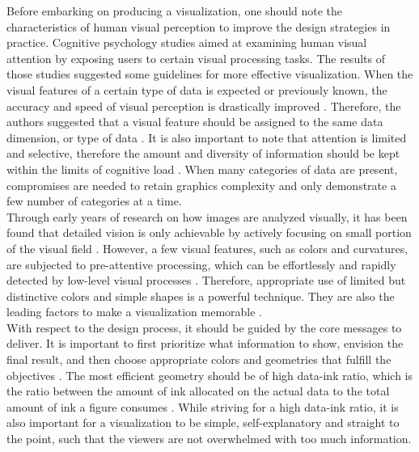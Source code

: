 \documentclass[11pt, a4paper,oneside,chapterprefix=false]{scrbook}
\begin{document}
Before embarking on producing a visualization, one should note the characteristics of human visual perception to improve the design strategies in practice. Cognitive psychology studies aimed at examining human visual attention by exposing users to certain visual processing tasks. The results of those studies suggested some guidelines for more effective visualization. When the visual features of a certain type of data is expected or previously known, the accuracy and speed of visual perception is drastically improved \cite{haroz2012capacity}. Therefore, the authors suggested that a visual feature should be assigned to the same data dimension, or type of data \cite{haroz2012capacity}. It is also important to note that attention is limited and selective, therefore the amount and diversity of information should be kept within the limits of cognitive load \cite{alhadad2018visualizing}. When many categories of data are present, compromises are needed to retain graphics complexity and only demonstrate a few number of categories at a time. \\

Through early years of research on how images are analyzed visually, it has been found that detailed vision is only achievable by actively focusing on small portion of the visual field \cite{itti2001computational, noton1971scanpaths}. However, a few visual features, such as colors and curvatures, are subjected to pre-attentive processing, which can be effortlessly and rapidly detected by low-level visual processes \cite{healey2011attention}. Therefore, appropriate use of limited but distinctive colors and simple shapes is a powerful technique. They are also the leading factors to make a visualization memorable \cite{borkin2013makes}. \\

With respect to the design process, it should be guided by the core messages to deliver. It is important to first prioritize what information to show, envision the final result, and then choose appropriate colors and geometries that fulfill the objectives \cite{midway2020principles}. The most efficient geometry should be of high data-ink ratio, which is the ratio between the amount of ink allocated on the actual data to the total amount of ink a figure consumes \cite{tufte1983visual}. While striving for a high data-ink ratio, it is also important for a visualization to be simple, self-explanatory  and straight to the point, such that the viewers are not overwhelmed with too much information. \\
\end{document}
